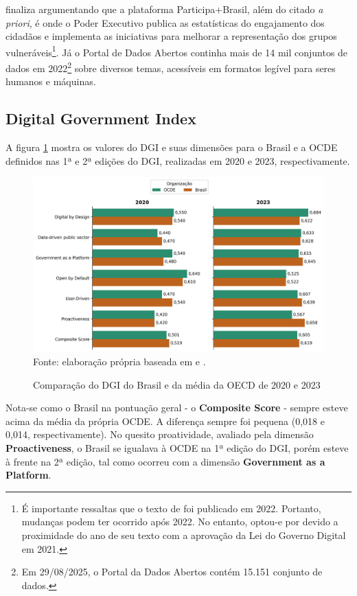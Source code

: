 \cite{gtmi_2022_latinamerica} finaliza argumentando que a plataforma Participa+Brasil, além do citado \textit{a priori}, é onde o Poder Executivo publica as estatísticas do engajamento dos cidadãos e implementa as iniciativas para melhorar a representação dos grupos vulneráveis\footnote{É importante ressaltas que o texto de \cite{gtmi_2022_latinamerica} foi publicado em 2022. Portanto, mudanças podem ter ocorrido após 2022. No entanto, optou-e por \cite{gtmi_2022_latinamerica} devido a proximidade do ano de seu texto com a aprovação da Lei do Governo Digital em 2021.}. Já o Portal de Dados Abertos continha mais de 14 mil conjuntos de dados em 2022\footnote{Em 29/08/2025, o Portal da Dados Abertos contém 15.151 conjunto de dados.} sobre diversos temas, acessíveis em formatos legível para seres humanos e máquinas. 

\subsection{Digital Government Index}

A figura \ref{fig:comparacao_dgi_brasil_mundo_2020_2023} mostra os valores do DGI e suas dimensões para o Brasil e a OCDE definidos nas 1ª e 2ª edições do DGI, realizadas em 2020 e 2023, respectivamente. 

\begin{figure}[H]
	\centering
	\caption{Comparação do DGI do Brasil e da média da OECD de 2020 e 2023}
	\includegraphics[width=1\linewidth]{figuras/comparacao_dgi_brasil_mundo_2020_2023}
	\label{fig:comparacao_dgi_brasil_mundo_2020_2023}
	\footnotesize{Fonte: elaboração própria baseada em \cite{dgi_2020} e \cite{dgi_2023}.}
\end{figure}

Nota-se como o Brasil na pontuação geral - o \textbf{Composite Score} - sempre esteve acima da média da própria OCDE. A diferença sempre foi pequena (0,018 e 0,014, respectivamente). No quesito proatividade, avaliado pela dimensão \textbf{Proactiveness}, o Brasil se igualava à OCDE na 1ª edição do DGI, porém esteve à frente na 2ª edição, tal como ocorreu com a dimensão \textbf{Government as a Platform}.

